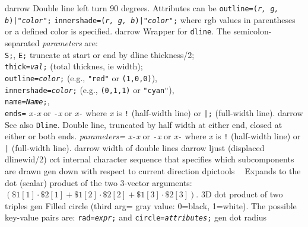 %
  {darrow}%
  {Double line left turn 90 degrees.  Attributes can be
    {\tt outline=({\sl r, g, b})|"{\sl color}";}
    {\tt innershade=({\sl r, g, b})|"{\sl color}";}
    where rgb values in parentheses or a defined color is specified.}%
%
  {darrow}%
  {Wrapper for {\tt dline}.
  The semicolon-separated {\sl parameters} are:\\
    {\tt S;}, {\tt E;} truncate at start or end by dline thickness/2;\\
    {\tt thick={\sl val};}   (total thicknes, ie width);\\
    {\tt outline={\sl color};} (e.g., {\tt "red"} or {\tt (1,0,0)}),\\
    {\tt innershade={\sl color};} (e.g., {\tt (0,1,1)} or {\tt "cyan"}),\\
    {\tt name={\sl Name};},\\
    {\tt ends=}%
      {\sl x}{\tt -}{\sl x} or
      {\tt -}{\sl x} or
      {\sl x}{\tt -} where {\sl x} is {\tt !} (half-width line)
       or {\tt |;} (full-width line).}%
%
  {darrow}%
  {See also {\tt Dline}.
   Double line, truncated by half width at either end, closed
    at either or both ends.
   {\sl parameters=}
      {\sl x}{\tt -}{\sl x} or
      {\tt -}{\sl x} or
      {\sl x}{\tt -} where {\sl x} is {\tt !} (half-width line)
       or {\tt |} (full-width line).}%
%
  {darrow}%
  {width of double lines}%
%
  {darrow}%
  {ljust (displaced dlinewid/2)}%
%
  {cct}%
  {internal character sequence that specifies which subcomponents are drawn}%
%
  {gen}%
  {down with respect to current direction}%
%
  {dpictools}%
  {$\;\;$ Expands to the dot (scalar) product of the two 3-vector arguments:
   $(\${}1[1]\cdot\${}2[1] + \${}1[2]\cdot\${}2[2] + \${}1[3]\cdot\${}2[3])$.}%
%
  {3D}%
  {dot product of two triples}%
%
  {gen}%
  {Filled circle (third arg= gray value: 0=black, 1=white). The possible
   key-value pairs are:
    {\tt rad={\sl expr};} and
    {\tt circle={\sl attributes};} }%
%
  {gen}%
  {dot radius}%
